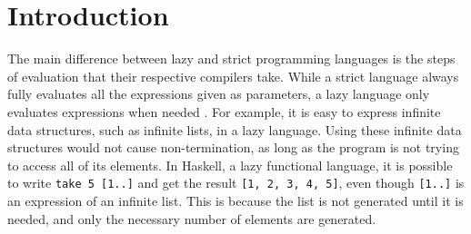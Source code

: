 \section{Introduction}

The main difference between lazy and strict programming languages is the steps
of evaluation that their respective compilers take. While a strict language
always fully evaluates all the expressions given as parameters, a lazy language
only evaluates expressions when needed \cite{ThunkHas27:online}. For example, it is easy to express
infinite data structures, such as infinite lists, in a lazy language. Using
these infinite data structures would not cause non-termination, as long as the
program is not trying to access all of its elements. In Haskell, a lazy
functional language, it is possible to write \texttt{take 5 [1..]} and get the
result \texttt{[1, 2, 3, 4, 5]}, even though \texttt{[1..]} is
an expression of an infinite list. This is because the list is not generated
until it is needed, and only the necessary number of elements are generated.

